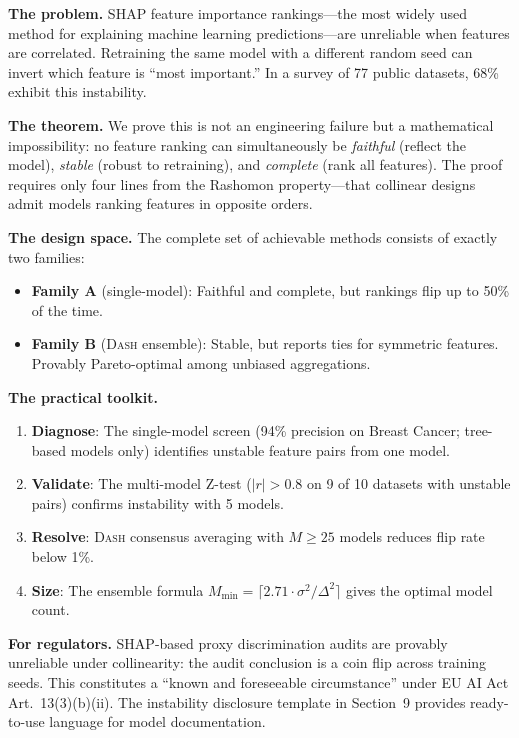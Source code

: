\documentclass{article}
\newcommand{\DASH}{\textsc{Dash}}
\begin{document}
\noindent\textbf{The problem.} SHAP feature importance rankings---the most widely used method for explaining machine learning predictions---are unreliable when features are correlated. Retraining the same model with a different random seed can invert which feature is ``most important.'' In a survey of 77 public datasets, 68\% exhibit this instability.

\noindent\textbf{The theorem.} We prove this is not an engineering failure but a mathematical impossibility: no feature ranking can simultaneously be \emph{faithful} (reflect the model), \emph{stable} (robust to retraining), and \emph{complete} (rank all features). The proof requires only four lines from the Rashomon property---that collinear designs admit models ranking features in opposite orders.

\noindent\textbf{The design space.} The complete set of achievable methods consists of exactly two families:
\begin{itemize}
    \item \textbf{Family A} (single-model): Faithful and complete, but rankings flip up to 50\% of the time.
    \item \textbf{Family B} (\DASH{} ensemble): Stable, but reports ties for symmetric features. Provably Pareto-optimal among unbiased aggregations.
\end{itemize}

\noindent\textbf{The practical toolkit.}
\begin{enumerate}
    \item \textbf{Diagnose}: The single-model screen (94\% precision on Breast Cancer; tree-based models only) identifies unstable feature pairs from one model.
    \item \textbf{Validate}: The multi-model Z-test ($|r| > 0.8$ on 9 of 10 datasets with unstable pairs) confirms instability with 5 models.
    \item \textbf{Resolve}: \DASH{} consensus averaging with $M \geq 25$ models reduces flip rate below 1\%.
    \item \textbf{Size}: The ensemble formula $M_{\min} = \lceil 2.71 \cdot \sigma^2/\Delta^2 \rceil$ gives the optimal model count.
\end{enumerate}

\noindent\textbf{For regulators.} SHAP-based proxy discrimination audits are provably unreliable under collinearity: the audit conclusion is a coin flip across training seeds. This constitutes a ``known and foreseeable circumstance'' under EU AI Act Art.~13(3)(b)(ii). The instability disclosure template in Section~9 provides ready-to-use language for model documentation.
\end{document}
